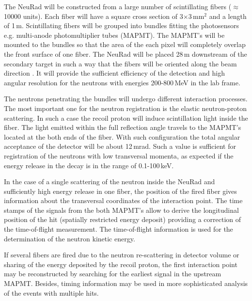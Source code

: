 \documentclass{webofc}
\begin{document}
The NeuRad will be constructed from a large number of scintillating fibers ($\approx$10000 units). Each fiber will have a square cross section of 3$\times$3\,mm$^2$ and a length of 1\,m. Scintillating fibers will be grouped into bundles fitting the photosensors e.g. multi-anode photomultiplier tubes (MAPMT). The MAPMT's will be mounted to the bundles so that the area of the each pixel will completely overlap the front surface of one fiber.
%
The NeuRad will be placed 28\,m downstream of the secondary target in such a way that the fibers will be oriented along the beam direction \cite{report}.
It will provide the sufficient efficiency of the detection and high angular resolution for the neutrons with energies 200-800\,MeV in the lab frame.

The neutrons penetrating the bundles will undergo different interaction processes. The most important one for the neutron registration is the elastic neutron-proton scattering. In such a case the recoil proton will induce scintillation light inside the fiber.
The light emitted within the full reflection angle travels to the MAPMT's located at the both ends of the fiber.
With such configuration the total angular acceptance of the detector will be about 12\,mrad.
Such a value is sufficient for registration of the neutrons with low transversal momenta, as expected if the energy release in the decay is in the range of 0.1-100\,keV.

In the case of a single scattering of the neutron inside the NeuRad and sufficiently high energy release in one fiber, the position of the fired fiber gives information about the transversal coordinates of the interaction point. The time stamps of the signals from the both MAPMT's allow to derive the longitudinal position of the hit (spatially restricted energy deposit) providing a correction of the time-of-flight measurement. The time-of-flight information is used for the determination of the neutron kinetic energy. 

If several fibers are fired due to the neutron re-scattering in detector volume or sharing of the energy deposited by the recoil proton, the first interaction point may be reconstructed by searching for the earliest signal in the upstream MAPMT. Besides, timing information may be used in more sophisticated analysis of the events with multiple hits. 
\end{document}
